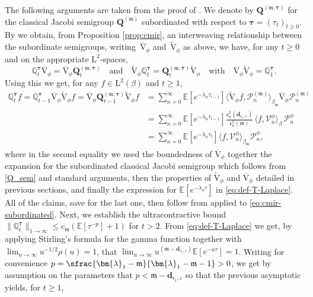 \documentclass[10pt]{amsart}
\let\epsilon\varepsilon
\theoremstyle{plain}
\theoremstyle{definition}
\newcommand{\E}{\mathbb{E}}
\renewcommand{\P}{\mathcal{P}}
\newcommand{\V}{\mathcal{V}}
\newcommand{\J}{\mathds{Q}}
\newcommand{\Leb}{\mathrm{L}}
\newcommand{\m}{\mathfrak{m}}
\newcommand{\dpt}{\bm{d}_{\vat,\epsilon}}
\newcommand{\lam}{{\bm{\lambda}_1}}
\newcommand{\vat}{{\mathsf{r}_1}}
\newcommand{\Q}[1][\mo]{\mathbf{Q}^{({#1})}}
\newcommand{\gab}[1][\lam,\mo]{{\beta_{#1}}}
\let\mo\mu
\let\bpsi\beta
\begin{document}
The following arguments are taken from the proof of \cite[Prop.\,5]{Gateway}. We denote by $\Q[\m,\bm{\tau}]$ for the classical Jacobi semigroup $\Q[\m]$ subordinated with respect to $\bm{\tau} = (\tau_t)_{t \geq 0}$. By \cite[Th.\,3]{Patie-Miclo} we obtain, from Proposition \ref{prop:cmir}, an interweaving relationship between the subordinate semigroups, \ie writing~$\overline{\mathrm{V}}_\phi$ and~$\widetilde{\mathrm{V}}_\phi$ as above, we have, for any $t \geq 0$ and on the appropriate $\Leb^2$-spaces,
\begin{equation}
\label{eq:cmir-subordinated}
\J_t^{\bm{\tau}} \overline{\mathrm{V}}_\phi = \overline{\mathrm{V}}_\phi \Q[\m,\bm{\tau}]_t \quad \text{and} \quad \widetilde{\mathrm{V}}_\phi \J_t^{\bm{\tau}} = \Q[\m,\bm{\tau}]_t \widetilde{\mathrm{V}}_\phi \quad \text{with} \quad \overline{\mathrm{V}}_\phi\widetilde{\mathrm{V}}_\phi = \J_1^{\bm{\tau}}.
\end{equation}
Using this we get, for any $f \in \Leb^2(\bpsi)$ and $t \geq 1$,
\begin{align*}
\J_t^{\bm{\tau}} f = \J_{t-1}^{\bm{\tau}} \overline{\mathrm{V}}_\phi \widetilde{\mathrm{V}}_\phi f = \overline{\mathrm{V}}_\phi \Q[\m,\bm{\tau}]_{t-1} \widetilde{\mathrm{V}}_\phi f &= \sum_{n=0}^\infty \E\left[e^{-\lambda_n \tau_{t-1}}\right] \langle \widetilde{\mathrm{V}}_\phi f, \P_n^{(\m)} \rangle_{\gab[\m]} \overline{\mathrm{V}}_\phi \P_n^{(\m)} \\
&= \sum_{n=0}^\infty \E\left[e^{-\lambda_n \tau_{t-1}}\right] \frac{\mathfrak{c}_n^2(\dpt)}{\mathfrak{c}_n^2(\m)}\, \langle f, \V_n^\phi \rangle_{\bpsi}\, \P_n^\phi \\
&= \sum_{n=0}^\infty \E\left[e^{-\lambda_n \tau_t}\right] \langle f, \V_n^\phi \rangle_{\gab[\m]} \P_n^\phi,
\end{align*}
where in the second equality we used the boundedness of $\overline{\mathrm{V}}_\phi$ together the expansion for the subordinated classical Jacobi semigroup which follows from \eqref{Q_sem} and standard arguments, then the properties of $\widetilde{\mathrm{V}}_\phi$ and $\overline{\mathrm{V}}_\phi$ detailed in previous sections, and finally the expression for $\E[e^{-\lambda_n \tau}]$ in \eqref{eq:def-T-Laplace}. All of the claims, save for the last one, then follow from \cite[Ths.\,7, 24]{Patie-Miclo} applied to \eqref{eq:cmir-subordinated}. Next, we establish the ultracontractive bound $\|\J_t^{\bm{\tau}}\|_{1\to\infty} \leq c_\m(\E[\tau^{-p}]+1)$ for $t > 2$. From \eqref{eq:def-T-Laplace} we get, by applying Stirling's formula for the gamma function together with $\lim_{u \to \infty} u^{-1/2}\rho(u) = 1$, that $\lim_{u \to \infty} u^{(\m-\dpt)} \E[e^{-u \tau}] = 1$. Writing for convenience $p = \sfrac{\lam-\m}{\lam-\m-1} > 0$, we get by assumption on the parameters that $p < \m-\dpt$ so that the previous asymptotic yields, for $t \geq 1$,
\end{document}

